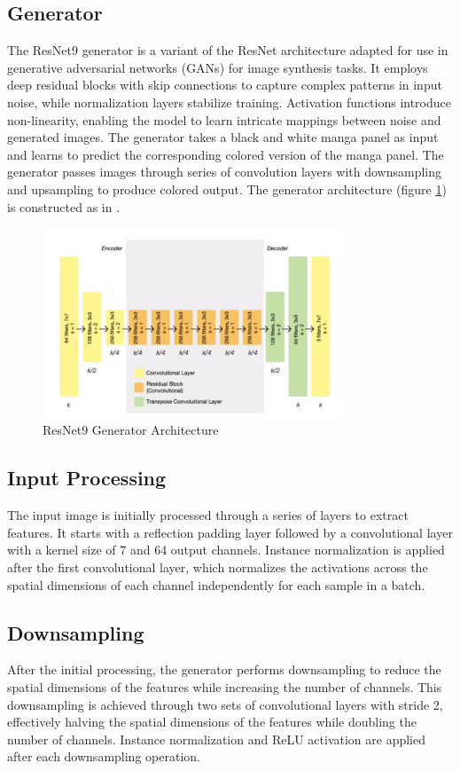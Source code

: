 \subsection{Generator}
The ResNet9 generator is a variant of the ResNet architecture adapted for use in generative adversarial networks (GANs) for image synthesis tasks. It employs deep residual blocks with skip connections to capture complex patterns in input noise, while normalization layers stabilize training. Activation functions introduce non-linearity, enabling the model to learn intricate mappings between noise and generated images.
The generator takes a black and white manga panel as input and learns to predict the corresponding colored version of the manga panel. The generator passes images through series of convolution layers with downsampling and upsampling to produce colored output. The generator architecture (figure \ref{fig:Generator Architecture}) is constructed as in \cite{simonyan2015deep}. 

\begin{figure}[h!]
  \centering
  \includegraphics[width=0.8\textwidth]{img/generator (1).png}
  \caption{ResNet9 Generator Architecture }
  \label{fig:Generator Architecture}
\end{figure}

\subsection*{Input Processing}
The input image is initially processed through a series of layers to extract features. It starts with a reflection padding layer followed by a convolutional layer with a kernel size of 7 and 64 output channels.
Instance normalization is applied after the first convolutional layer, which normalizes the activations across the spatial dimensions of each channel independently for each sample in a batch.
\subsection*{Downsampling}
After the initial processing, the generator performs downsampling to reduce the spatial dimensions of the features while increasing the number of channels. This downsampling is achieved through two sets of convolutional layers with stride 2, effectively halving the spatial dimensions of the features while doubling the number of channels. Instance normalization and ReLU activation are applied after each downsampling operation.
